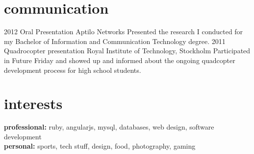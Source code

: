 \documentclass[]{friggeri-cv} %
\begin{document}

\section{communication}

\begin{entrylist}
\entry
{2012}
{Oral Presentation}
{Aptilo Networks}
{Presented the research I conducted for my Bachelor of Information and Communication Technology degree.}
\entry
{2011}
{Quadrocopter presentation}
{Royal Institute of Technology, Stockholm}
{Participated in Future Friday and showed up and informed about the ongoing quadcopter development process for high school students.}
\end{entrylist}


\section{interests}

\textbf{professional:} ruby, angularjs, mysql, databases, web design, software development
\\
\textbf{personal:} sports, tech stuff, design, food, photography, gaming

\end{document}
